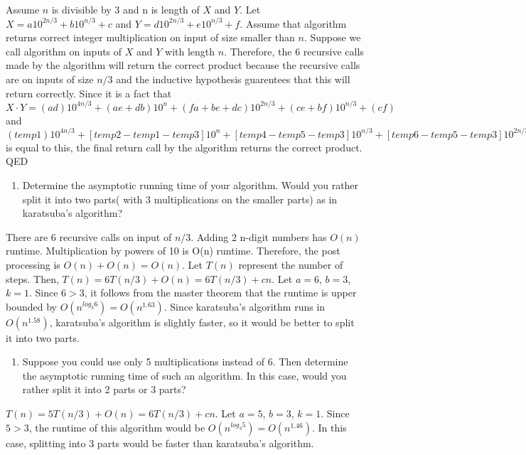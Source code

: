 \documentclass[11pt]{article}
\providecommand{\tightlist}{%
      \setlength{\itemsep}{0pt}\setlength{\parskip}{0pt}}
\begin{document}
Assume \(n\) is divisible by 3 and n is length of \(X\) and \(Y\). Let
\(X = a10^{2n/3} + b10^{n/3} + c\) and
\(Y = d10^{2n/3} + e10^{n/3} + f\). Assume that algorithm returns
correct integer multiplication on input of size smaller than \(n\).
Suppose we call algorithm on inputs of \(X\) and \(Y\) with length
\(n\). Therefore, the 6 recursive calls made by the algorithm will
return the correct product because the recursive calls are on inputs of
size \(n/3\) and the inductive hypothesis guarentees that this will
return correctly. Since it is a fact that
\(X \cdot Y = (ad)10^{4n/3} + (ae+db)10^{n} + (fa+be+dc)10^{2n/3} + (ce+bf)10^{n/3} + (cf)\)
and
\((temp1)10^{4n/3} + [temp2 - temp1 - temp3]10^{n} + [temp4 - temp5 - temp3]10^{n/3} + [temp6 - temp5 - temp3]10^{2n/3} + (temp5)\)
is equal to this, the final return call by the algorithm returns the
correct product. QED

    \begin{enumerate}
\def\labelenumi{\arabic{enumi}.}
\setcounter{enumi}{1}
\tightlist
\item
  Determine the asymptotic running time of your algorithm. Would you
  rather split it into two parts( with 3 multiplications on the smaller
  parts) as in karatsuba's algorithm?
\end{enumerate}

    There are 6 recursive calls on input of \(n/3\). Adding 2 n-digit
numbers has \(O(n)\) runtime. Multiplication by powers of 10 is O(n)
runtime. Therefore, the post processing is \(O(n) + O(n) = O(n)\). Let
\(T(n)\) represent the number of steps. Then,
\(T(n) = 6T(n/3) + O(n) = 6T(n/3) + cn\). Let \(a=6\), \(b=3\), \(k=1\).
Since \(6>3\), it follows from the master theorem that the runtime is
upper bounded by \(O(n^{log_{3}6}) = O(n^{1.63})\). Since karatsuba's
algorithm runs in \(O(n^{1.58})\), karatsuba's algorithm is slightly
faster, so it would be better to split it into two parts.

    \begin{enumerate}
\def\labelenumi{\arabic{enumi}.}
\setcounter{enumi}{1}
\tightlist
\item
  Suppose you could use only 5 multiplications instead of 6. Then
  determine the asymptotic running time of such an algorithm. In this
  case, would you rather split it into 2 parts or 3 parts?
\end{enumerate}

    \(T(n) = 5T(n/3) + O(n) = 6T(n/3) + cn\). Let \(a=5\), \(b=3\), \(k=1\).
Since \(5 > 3\), the runtime of this algorithm would be
\(O(n^{log_{3}5}) = O(n^{1.46})\). In this case, splitting into 3 parts
would be faster than karatsuba's algorithm.
\end{document}

